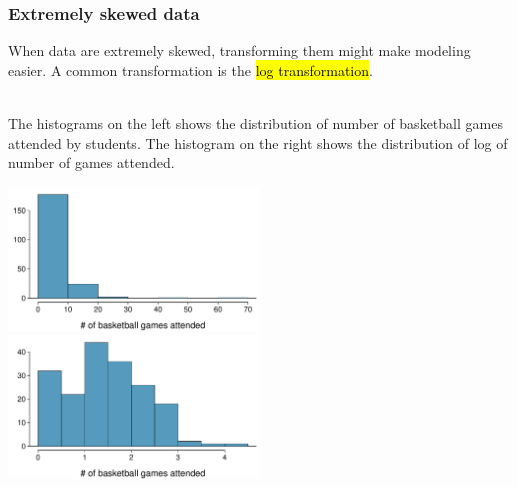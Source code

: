 \begin{frame}
\frametitle{Extremely skewed data}

When data are extremely skewed, transforming them might make modeling easier. A common transformation is the \hl{log transformation}.

$\:$ \\
\pause
The histograms on the left shows the distribution of number of basketball games attended by students. The histogram on the right shows the distribution of log of number of games attended.

\begin{center}
\includegraphics[width=0.5\textwidth]{2-1_numerical_data/figures/basket_games/basket_games_hist}
\includegraphics[width=0.5\textwidth]{2-1_numerical_data/figures/basket_games/basket_games_hist_log}
\end{center}

\end{frame}


